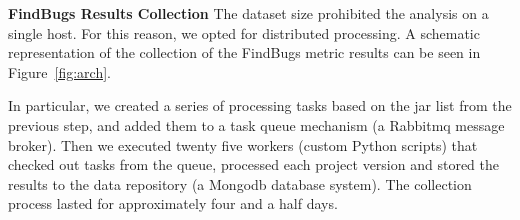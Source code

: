\documentclass{sig-alternate}
\begin{document}



{\bf FindBugs Results Collection} The dataset
size prohibited the analysis
on a single host. For this reason,
we opted for distributed processing.
A schematic representation of the collection of
the FindBugs metric results can be seen in Figure~\ref{fig:arch}.


In particular, we created a series of processing tasks
based on the {\sc jar} list from the
previous step, and added them to a task queue mechanism (a
Rabbit{\sc mq} message broker). Then we executed twenty five
workers (custom Python scripts) that checked out tasks from
the queue, processed each project version and stored the
results to the data repository (a Mongo{\sc db} database system).
The collection process lasted for approximately four and
a half days.
\end{document}

